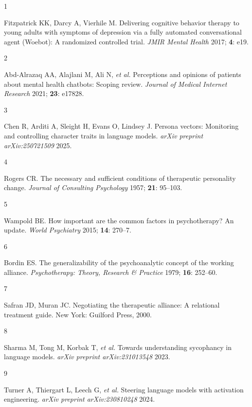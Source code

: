 \documentclass[
  10pt,
  a4paper,
  onecolumn]{article}
\newlength{\cslhangindent}
\newlength{\csllabelwidth}
\newenvironment{CSLReferences}[2] %
 {\begin{list}{}{%
  \setlength{\itemindent}{0pt}
  \setlength{\leftmargin}{0pt}
  \setlength{\parsep}{0pt}
  \ifodd #1
   \setlength{\leftmargin}{\cslhangindent}
   \setlength{\itemindent}{-1\cslhangindent}
  \fi
  \setlength{\itemsep}{#2\baselineskip}}}
 {\end{list}}
\newcommand{\CSLLeftMargin}[1]{\parbox[t]{\csllabelwidth}{\strut#1\strut}}
\newcommand{\CSLRightInline}[1]{\parbox[t]{\linewidth - \csllabelwidth}{\strut#1\strut}}
\begin{document}
\label{refs}
\begin{CSLReferences}{0}{1}
\CSLLeftMargin{1 }%
\CSLRightInline{Fitzpatrick KK, Darcy A, Vierhile M. Delivering
cognitive behavior therapy to young adults with symptoms of depression
via a fully automated conversational agent ({Woebot}): A randomized
controlled trial. \emph{JMIR Mental Health} 2017; \textbf{4}: e19.}

\CSLLeftMargin{2 }%
\CSLRightInline{Abd-Alrazaq AA, Alajlani M, Ali N, \emph{et al.}
Perceptions and opinions of patients about mental health chatbots:
Scoping review. \emph{Journal of Medical Internet Research} 2021;
\textbf{23}: e17828.}

\CSLLeftMargin{3 }%
\CSLRightInline{Chen R, Arditi A, Sleight H, Evans O, Lindsey J. Persona
vectors: Monitoring and controlling character traits in language models.
\emph{arXiv preprint arXiv:250721509} 2025.}

\CSLLeftMargin{4 }%
\CSLRightInline{Rogers CR. The necessary and sufficient conditions of
therapeutic personality change. \emph{Journal of Consulting Psychology}
1957; \textbf{21}: 95--103.}

\CSLLeftMargin{5 }%
\CSLRightInline{Wampold BE. How important are the common factors in
psychotherapy? An update. \emph{World Psychiatry} 2015; \textbf{14}:
270--7.}

\CSLLeftMargin{6 }%
\CSLRightInline{Bordin ES. The generalizability of the psychoanalytic
concept of the working alliance. \emph{Psychotherapy: Theory, Research
\& Practice} 1979; \textbf{16}: 252--60.}

\CSLLeftMargin{7 }%
\CSLRightInline{Safran JD, Muran JC. Negotiating the therapeutic
alliance: A relational treatment guide. New York: Guilford Press, 2000.}

\CSLLeftMargin{8 }%
\CSLRightInline{Sharma M, Tong M, Korbak T, \emph{et al.} Towards
understanding sycophancy in language models. \emph{arXiv preprint
arXiv:231013548} 2023.}

\CSLLeftMargin{9 }%
\CSLRightInline{Turner A, Thiergart L, Leech G, \emph{et al.} Steering
language models with activation engineering. \emph{arXiv preprint
arXiv:230810248} 2024.}


\end{CSLReferences}
\end{document}
